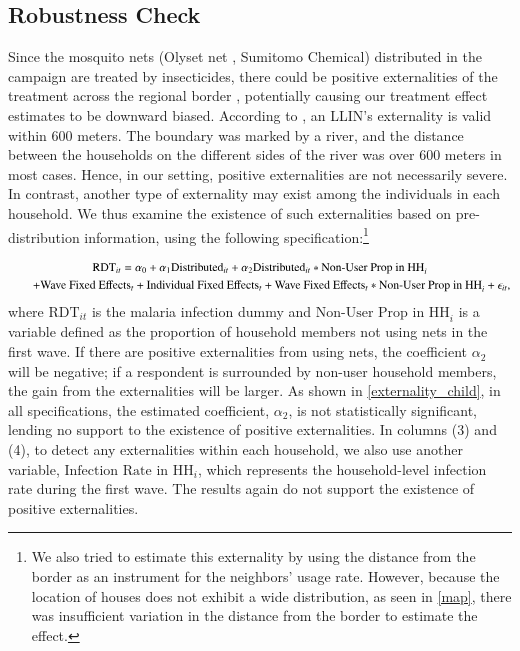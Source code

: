 \documentclass[fleqn,11pt]{article}
\begin{document}
\subsection{Robustness Check}
Since the mosquito nets (Olyset net \textregistered, Sumitomo Chemical) distributed in the campaign
are treated by insecticides, there could be positive externalities of
the treatment across the regional border \citep{hawley_community-wide_2003-1}, potentially causing our treatment effect estimates to be downward biased. According to \cite{gimnig_effect_2003}, an LLIN's externality is valid within
600 meters. The boundary was marked by a river, and the distance between
the households on the different sides of the river was over 600 meters in most 
cases. Hence, in our setting, positive externalities are not necessarily severe. In contrast, another type of externality may exist among the individuals in each household. We thus examine the existence of such externalities based on pre-distribution information, using the following specification:\footnote{%
We also tried to estimate this externality by using the distance from the
border as an instrument for the neighbors' usage rate. However, because the
location of houses does not exhibit a wide distribution, as seen in \autoref{map},
there was insufficient variation in the distance from the border to estimate the effect.}

\begin{gather}
\text{RDT}_{it}=\alpha _0+\alpha _1\text{Distributed} _{it} + \alpha_2 \text{Distributed}_{it} *\text{Non-User Prop in HH}_i \\ \notag \quad \quad + \text{Wave Fixed Effects}_t +\text{Individual Fixed Effects}_t +\text{Wave Fixed Effects}_t*\text{Non-User Prop in HH}_i + \epsilon _{it},
\end{gather}
where $\text{RDT}_{it}$ is the malaria infection dummy and $\text{Non-User Prop in HH}_i$ is a variable defined as the proportion of household members not using nets in the first wave. If there are positive externalities from using nets, the coefficient $\alpha_2$ will be negative; if a respondent is surrounded by non-user household members, the gain from the externalities will be larger. As shown in \autoref{externality_child}, in all specifications, the estimated coefficient, $\alpha_2$, is not statistically significant, lending no support to the existence of positive externalities. In columns (3) and (4), to detect any externalities within each household, we also use another variable, $\text{Infection Rate in HH}_i$, which represents the household-level infection rate during the first wave. The results again do not support the existence of positive externalities.
\end{document}
